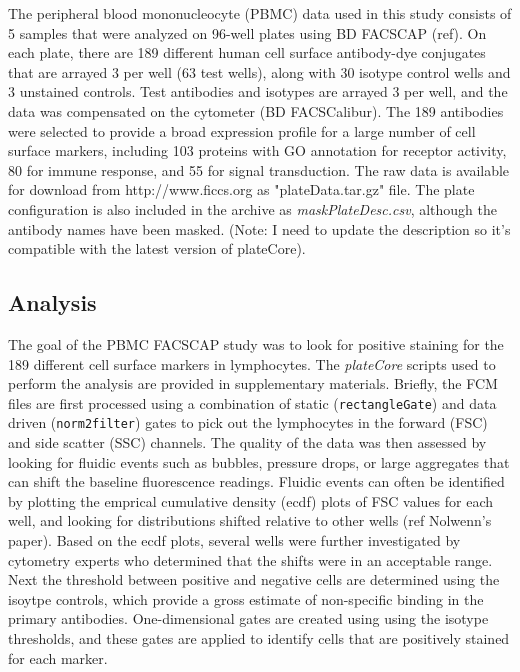 \documentclass[12pt]{article}
\newcommand{\Robject}[1]{{\texttt{#1}}}
\newcommand{\Rpackage}[1]{{\textit{#1}}}
\begin{document}
The peripheral blood mononucleocyte (PBMC) data used in this study consists of 5 samples that were analyzed on 96-well plates
using BD FACS\texttrademark CAP (ref). On each plate, there are 189 different human cell surface antibody-dye conjugates that
are arrayed 3 per well (63 test wells), along with 30 isotype control wells and 3 unstained controls.
Test antibodies and isotypes are arrayed 3 per well, and the data was compensated
on the cytometer (BD FACSCalibur\texttrademark). The 189 antibodies were selected to provide a broad expression profile
for a large number of cell surface markers, including 103 proteins with GO annotation for receptor activity, 80
for immune response, and 55 for signal transduction. The raw data is available for download from http://www.ficcs.org as
"plateData.tar.gz" file. The plate configuration is also included in the archive as \textit{maskPlateDesc.csv}, although
the antibody names have been masked. (Note: I need to update the description so it's compatible with the latest version of plateCore).

\subsection*{Analysis}

The goal of the PBMC FACS\texttrademark CAP study was to look for positive staining for the 189 different cell
surface markers in lymphocytes. The \Rpackage{plateCore} scripts used to perform the analysis are provided 
in supplementary materials. Briefly, the FCM files are first processed using a combination of static (\Robject{rectangleGate})
and data driven (\Robject{norm2filter}) gates to pick out the lymphocytes in the forward (FSC) and side scatter (SSC)
channels.  The quality of the data was then assessed by looking for fluidic events such as bubbles,
pressure drops, or large aggregates that can shift the baseline fluorescence readings. 
Fluidic events can often be identified by plotting the emprical cumulative density (ecdf) plots of FSC
values for each well, and looking for distributions shifted relative to other wells (ref Nolwenn's paper). Based on the ecdf
plots, several wells were further investigated by cytometry experts who determined that the shifts were in an acceptable range.
Next the threshold between positive and negative cells are determined using the isoytpe controls, which provide a gross estimate
of non-specific binding in the primary antibodies. One-dimensional gates are created using using the isotype thresholds, and these
gates are applied to identify cells that are positively stained for each marker. 
\end{document}
